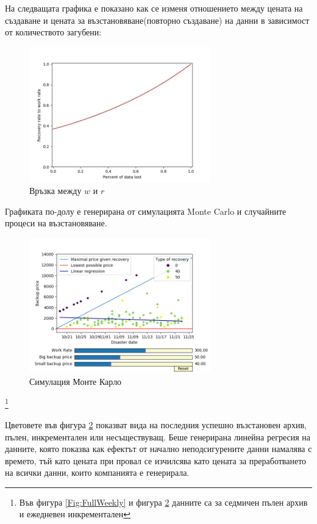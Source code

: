 \documentclass[11pt, a4paper]{article}
\theoremstyle{definition}
\newcommand\blfootnote[1]{%
	\begingroup
	\renewcommand\thefootnote{}\footnote{#1}%
	\addtocounter{footnote}{-1}%
	\endgroup
}
\begin{document}
		На следващата графика е показано как се изменя отношението между цената на създаване и цената за възстановяване(повторно създаване) на данни в зависимост от количеството загубени:
		\begin{figure}[H]
			\begin{minipage}{1.0\textwidth}
				\centering
				\includegraphics[width=0.7\textwidth]{Recovery_rate.png}
				\caption{Връзка между $w$ и $r$}\label{Fig:Rec_rate}
			\end{minipage}
		\end{figure}
		Графиката по-долу е генерирана от симулацията Monte Carlo и случайните процеси на възстановяване.
		\begin{figure}[H]
			\begin{minipage}{1.0\textwidth}
				\centering
				\includegraphics[width=0.7\textwidth]{Weekly_full_carlo.png}
				\caption{Симулация Монте Карло}\label{Fig:MonteCarlo}
			\end{minipage}
		\end{figure}
		\blfootnote{Във фигура \ref{Fig:FullWeekly} и фигура \ref{Fig:MonteCarlo} данните са за седмичен пълен архив и ежедневен инкрементален}
		Цветовете във фигура \ref{Fig:MonteCarlo} показват вида на последния успешно възстановен архив, пълен, инкрементален или несъществуващ. Беше генерирана линейна регресия на данните, която показва как ефектът от начално неподсигурените данни намалява с времето, тъй като цената при провал се изчилсява като цената за преработването на всички данни, които компанията е генерирала.\par
\end{document}
